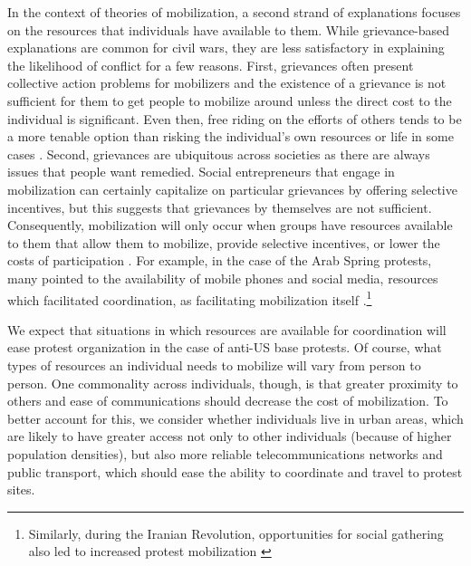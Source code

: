 In the context of theories of mobilization, a second strand of explanations focuses on the resources that individuals have available to them. While grievance-based explanations are common for civil wars, they are less satisfactory in explaining the likelihood of conflict for a few reasons. First, grievances often present collective action problems for mobilizers and the existence of a grievance is not sufficient for them to get people to mobilize around unless the direct cost to the individual is significant. Even then, free riding on the efforts of others tends to be a more tenable option than risking the individual's own resources or life in some cases \cite{lichbach1993}. Second, grievances are ubiquitous across societies as there are always issues that people want remedied. Social entrepreneurs that engage in mobilization can certainly capitalize on particular grievances by offering selective incentives, but this suggests that grievances by themselves are not sufficient.  Consequently, mobilization will only occur when groups have resources available to them that allow them to mobilize, provide selective incentives, or lower the costs of participation \cite{Olson1965,Tilly1973,Khawaja1994}. For example, in the case of the Arab Spring protests, many pointed to the availability of mobile phones and social media, resources which facilitated coordination, as facilitating mobilization itself \cite{Hussain2013}.\footnote{Similarly, during the Iranian Revolution, opportunities for social gathering also led to increased protest mobilization \cite{Rasler1996}}


We expect that situations in which resources are available for coordination will ease protest organization in the case of anti-US base protests. Of course, what types of resources an individual needs to mobilize will vary from person to person. One commonality across individuals, though, is that greater proximity to others and ease of communications should decrease the cost of mobilization. To better account for this, we consider whether individuals live in urban areas, which are likely to have greater access not only to other individuals (because of higher population densities), but also more reliable telecommunications networks and public transport, which should ease the ability to coordinate and travel to protest sites. 

